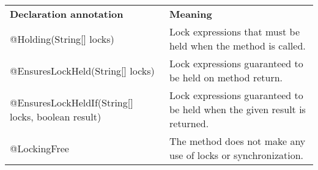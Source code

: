 \begin{tabular}{l|l|}
\textbf{Declaration annotation} & \textbf{Meaning} \\
@Holding(String[] locks) &
Lock expressions that must be held when the method is called.
\\
@EnsuresLockHeld(String[] locks) &
Lock expressions guaranteed to be held on method return.
\\
@EnsuresLockHeldIf(String[] locks, boolean result) &
Lock expressions guaranteed to be held when the given result is returned.
\\
@LockingFree &
The method does not make any use of locks or synchronization.
\\
\end{tabular}


